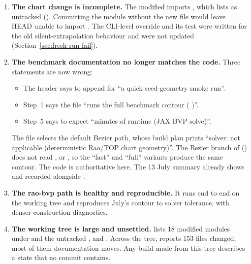 \begin{enumerate}
\item \textbf{The chart change is incomplete.} The modified  imports , which   lists as untracked (). Committing the module without the new file would leave HEAD unable to import . The CLI-level override and its test were written for the old silent-extrapolation behaviour and were not updated (Section~\ref{sec:fresh-run-fail}).
\item \textbf{The benchmark documentation no longer matches the code.} Three statements are now wrong:
  \begin{itemize}
  \item The  header says to append   for ``a quick seed-geometry smoke run''.
  \item {} Step~1 says the file ``runs the full benchmark contour ( )''.
  \item {} Step~5 says to expect ``minutes of runtime (JAX BVP solve)''.
  \end{itemize}
  The file selects the default Bezier path, whose build plan prints ``solver: not applicable (deterministic Rao/TOP chart geometry)''. The Bezier branch of  () does not read ,  or , so the ``fast'' and ``full'' variants produce the same contour. The code is authoritative here. The 13 July  summary already shows   and   recorded alongside  .
\item \textbf{The rao-bvp path is healthy and reproducible.} It runs end to end on the working tree and reproduces July's contour to solver tolerance, with denser construction diagnostics.
\item \textbf{The working tree is large and unsettled.}   lists 18 modified modules under  and the untracked ,  and . Across the tree,    reports 153 files changed, most of them documentation moves. Any build made from this tree describes a state that no commit contains.
\end{enumerate}

